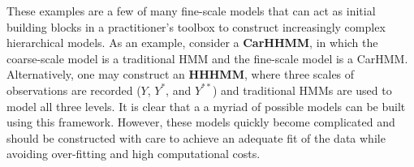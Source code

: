 These examples are a few of many fine-scale models that can act as initial building blocks in a practitioner's toolbox to construct increasingly complex hierarchical models. As an example, consider a \textbf{CarHHMM}, in which the coarse-scale model is a traditional HMM and the fine-scale model is a CarHMM. Alternatively, one may construct an \textbf{HHHMM}, where three scales of observations are recorded ($Y$, $Y^*$, and $Y^{**}$) and traditional HMMs are used to model all three levels. It is clear that a a myriad of possible models can be built using this framework. However, these models quickly become complicated and should be constructed with care to achieve an adequate fit of the data while avoiding over-fitting and high computational costs.
